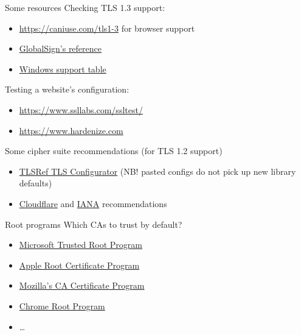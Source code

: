 \begin{frame}{Some resources}
  Checking TLS 1.3 support:
  \begin{itemize}
    \item {\small\url{https://caniuse.com/tls1-3}} for browser support
    \item \href{https://support.globalsign.com/ssl/general-ssl/tls-protocol-compatibility}{GlobalSign's reference}
    \item \href{https://learn.microsoft.com/en-us/windows/win32/secauthn/protocols-in-tls-ssl--schannel-ssp-}{Windows support table}
  \end{itemize}

  \pause
  Testing a website's configuration:
  \begin{itemize}
    \item {\small\url{https://www.ssllabs.com/ssltest/}}
    \item {\small\url{https://www.hardenize.com}}
  \end{itemize}

  \pause
  Some cipher suite recommendations (for TLS 1.2 support)
  \begin{itemize}
    \item \href{https://configurator.tlsref.org}{TLSRef TLS Configurator} {\footnotesize (NB! pasted configs do not pick up new library defaults)}
    \item \href{https://developers.cloudflare.com/ssl/reference/cipher-suites/recommendations/}{Cloudflare} and \href{https://www.iana.org/assignments/tls-parameters/tls-parameters.xhtml\#tls-parameters-4}{IANA} recommendations
  \end{itemize}
\end{frame}

\begin{frame}{Root programs}
  \pause
  Which CAs to trust by default?
  \begin{itemize}[<+(1)->]
    \item \href{https://aka.ms/RootCert}{Microsoft Trusted Root Program}
    \item \href{https://github.com/apple/apple-root-program/blob/main/policy.md}{Apple Root Certificate Program}
    \item \href{https://wiki.mozilla.org/CA}{Mozilla's CA Certificate Program}
    \item \href{https://g.co/chrome/root-policy}{Chrome Root Program}
    \item \dots
  \end{itemize}
\end{frame}

